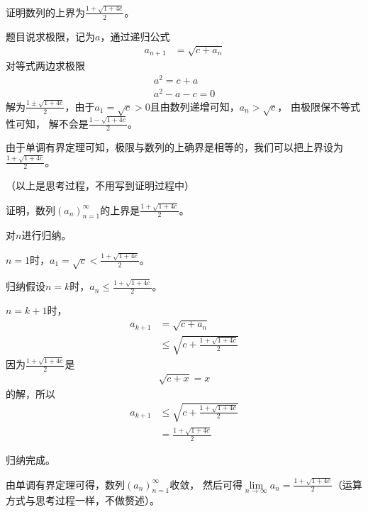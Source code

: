 \documentclass{article}
\begin{document}
\begin{itemize}
        证明数列的上界为$\frac{1 + \sqrt{1 + 4c}}{2}$。
        \begin{zthk}
          题目说求极限，记为$a$，通过递归公式
          \begin{align*}
            a_{n + 1} & = \sqrt{c + a_n}
          \end{align*}
          对等式两边求极限
          \begin{align*}
            a^2 = c + a \\
            a^2 -a - c = 0
          \end{align*}
          解为$\frac{1 \pm \sqrt{1 + 4c}}{2}$，由于$a_1 = \sqrt{c}>0$且由数列递增可知，$a_n > \sqrt{c}$，
          由极限保不等式性可知，
          解不会是$\frac{1 - \sqrt{1 + 4c}}{2}$。

          由于单调有界定理可知，极限与数列的上确界是相等的，我们可以把上界设为$\frac{1 + \sqrt{1 + 4c}}{2}$。
        \end{zthk}
        （以上是思考过程，不用写到证明过程中）

        证明，数列$(a_n)_{n = 1}^\infty$的上界是$\frac{1 + \sqrt{1 + 4c}}{2}$。

        对$n$进行归纳。

        $n = 1$时，$a_1 = \sqrt{c} < \frac{1 + \sqrt{1 + 4c}}{2}$。

        归纳假设$n = k$时，$a_n \leq \frac{1 + \sqrt{1 + 4c}}{2}$。

        $n = k + 1$时，
        \begin{align*}
          a_{k + 1} & = \sqrt{c + a_n}                            \\
                    & \leq \sqrt{c + \frac{1 + \sqrt{1 + 4c}}{2}}
        \end{align*}
        因为$\frac{1 + \sqrt{1 + 4c}}{2}$是
        \begin{align*}
          \sqrt{c + x} = x
        \end{align*}
        的解，所以
        \begin{align*}
          a_{k + 1} & \leq \sqrt{c + \frac{1 + \sqrt{1 + 4c}}{2}} \\
                    & = \frac{1 + \sqrt{1 + 4c}}{2}
        \end{align*}

        归纳完成。

        由单调有界定理可得，数列$(a_n)_{n = 1}^\infty$收敛，
        然后可得$\lim\limits_{n \to \infty} a_n = \frac{1 + \sqrt{1 + 4c}}{2}$（运算方式与思考过程一样，不做赘述）。



\end{itemize}
\end{document}
